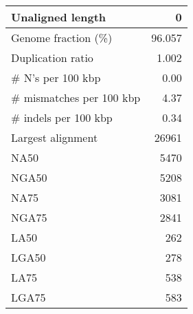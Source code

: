 \documentclass[12pt,a4paper]{article}
\begin{document}
\begin{table}[ht]
\begin{center}
\begin{tabular}{|l*{1}{|r}|}
Unaligned length & 0 \\ \hline
Genome fraction (\%) & 96.057 \\ \hline
Duplication ratio & 1.002 \\ \hline
\# N's per 100 kbp & 0.00 \\ \hline
\# mismatches per 100 kbp & 4.37 \\ \hline
\# indels per 100 kbp & 0.34 \\ \hline
Largest alignment & 26961 \\ \hline
NA50 & 5470 \\ \hline
NGA50 & 5208 \\ \hline
NA75 & 3081 \\ \hline
NGA75 & 2841 \\ \hline
LA50 & 262 \\ \hline
LGA50 & 278 \\ \hline
LA75 & 538 \\ \hline
LGA75 & 583 \\ \hline
\end{tabular}
\end{center}
\end{table}
\end{document}
